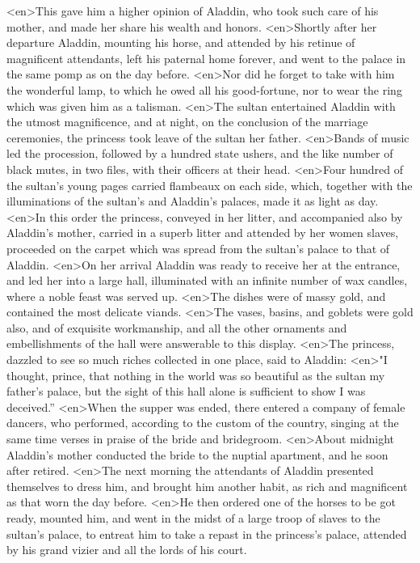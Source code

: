 <en>This gave him a higher opinion of Aladdin, who took such care of his mother, and made her share his wealth and honors.
<en>Shortly after her departure Aladdin, mounting his horse, and attended by his retinue of magnificent attendants, left his paternal home forever, and went to the palace in the same pomp as on the day before.
<en>Nor did he forget to take with him the wonderful lamp, to which he owed all his good-fortune, nor to wear the ring which was given him as a talisman.
<en>The sultan entertained Aladdin with the utmost magnificence, and at night, on the conclusion of the marriage ceremonies, the princess took leave of the sultan her father.
<en>Bands of music led the procession, followed by a hundred state ushers, and the like number of black mutes, in two files, with their officers at their head.
<en>Four hundred of the sultan’s young pages carried flambeaux on each side, which, together with the illuminations of the sultan’s and Aladdin’s palaces, made it as light as day.
<en>In this order the princess, conveyed in her litter, and accompanied also by Aladdin’s mother, carried in a superb litter and attended by her women slaves, proceeded on the carpet which was spread from the sultan’s palace to that of Aladdin.
<en>On her arrival Aladdin was ready to receive her at the entrance, and led her into a large hall, illuminated with an infinite number of wax candles, where a noble feast was served up.
<en>The dishes were of massy gold, and contained the most delicate viands.
<en>The vases, basins, and goblets were gold also, and of exquisite workmanship, and all the other ornaments and embellishments of the hall were answerable to this display.
<en>The princess, dazzled to see so much riches collected in one place, said to Aladdin:
<en>"I thought, prince, that nothing in the world was so beautiful as the sultan my father’s palace, but the sight of this hall alone is sufficient to show I was deceived.”
<en>When the supper was ended, there entered a company of female dancers, who performed, according to the custom of the country, singing at the same time verses in praise of the bride and bridegroom.
<en>About midnight Aladdin’s mother conducted the bride to the nuptial apartment, and he soon after retired.
<en>The next morning the attendants of Aladdin presented themselves to dress him, and brought him another habit, as rich and magnificent as that worn the day before.
<en>He then ordered one of the horses to be got ready, mounted him, and went in the midst of a large troop of slaves to the sultan’s palace, to entreat him to take a repast in the princess’s palace, attended by his grand vizier and all the lords of his court.
